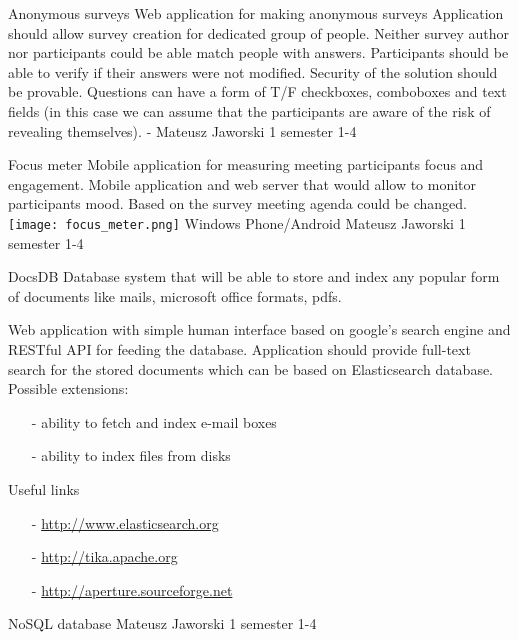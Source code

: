\begin{project}
{Anonymous surveys}
{Web application for making anonymous surveys}
{
Application should allow survey creation for dedicated group of people. 
Neither survey author nor participants could be able match people with answers.
Participants should be able to verify if their answers were not modified. 
Security of the solution should be provable. Questions can have a form of T/F
checkboxes, comboboxes and text fields (in this case we can assume that the
participants are aware of the risk of revealing themselves).
}
{-}
{Mateusz Jaworski}
{1 semester}
{1-4}
\end{project}
\begin{project}
{Focus meter}
{Mobile application for measuring meeting participants focus and engagement.}
{
Mobile application and web server that would allow to
monitor participants mood. Based on the survey meeting
agenda could be changed.
\texttt{[image: focus\_meter.png]}
}
{Windows Phone/Android}
{Mateusz Jaworski}
{1 semester}
{1-4}
\end{project}
\begin{project}
{DocsDB}
{Database system that will be able to store and index any popular form of
documents like mails, microsoft office formats, pdfs.}
{
Web application with simple human interface based on google’s search engine and RESTful API for feeding the database.
Application should provide full-text search for the stored documents which can be based on Elasticsearch database.
Possible extensions:
\begin{itemize}
  \item[-] ability to fetch and index e-mail boxes
  \item[-] ability to index files from disks
\end{itemize}
Useful links
\begin{itemize}
  \item[-] \url{http://www.elasticsearch.org}
  \item[-] \url{http://tika.apache.org}
  \item[-] \url{http://aperture.sourceforge.net}
\end{itemize}
}
{NoSQL database}
{Mateusz Jaworski}
{1 semester}
{1-4}
\end{project}

